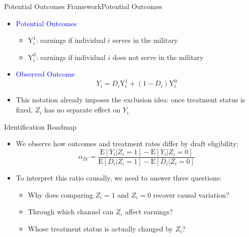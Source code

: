 \documentclass[dvipsnames,hyperref={pdfpagelabels=false}]{beamer}
\begin{document}
\begin{frame}{Potential Outcomes Framework}{Potential Outcomes}
	
	
	
	\begin{itemize}
		
		\item \textcolor{blue}{Potential Outcomes}
		\vspace{0.2cm}
		\begin{itemize}
			\item $\mathrm{Y}^{1}_{i}$: earnings if individual $i$ serves in the military
			\vspace{0.2cm}
			\item $\mathrm{Y}^{0}_{i}$: earnings if individual $i$ does not serve in the military
			\vspace{0.2cm}
		\end{itemize}
		\vspace{0.2cm}
		\item \textcolor{blue}{Observed Outcome}
		\begin{equation*}
			Y_{i}=D_{i}\mathrm{Y}^{1}_{i}+(1-D_{i})\mathrm{Y}^{0}_{i}
		\end{equation*}
		\vspace{0.2cm}
		\item This notation already imposes the exclusion idea: once treatment status is fixed, $Z_{i}$ has no separate effect on $Y_{i}$
		
	\end{itemize}
\end{frame}


\begin{frame}{Identification Roadmap}
	\begin{itemize}
		\item We observe how outcomes and treatment rates differ by draft eligibility:
		\begin{equation*}
			\alpha_{IV}=
			\dfrac{\mathrm{E}[Y_{i}|Z_{i}=1]-\mathrm{E}[Y_{i}|Z_{i}=0]}
			{\mathrm{E}[D_{i}|Z_{i}=1]-\mathrm{E}[D_{i}|Z_{i}=0]}
		\end{equation*}
		\vspace{0.2cm}
		\item To interpret this ratio causally, we need to answer three questions:
		\vspace{0.2cm}
		\begin{itemize}
			\item Why does comparing $Z_i=1$ and $Z_i=0$ recover causal variation?
			\vspace{0.2cm}
			\item Through which channel can $Z_i$ affect earnings?
			\vspace{0.2cm}
			\item Whose treatment status is actually changed by $Z_i$?
		\end{itemize}
	\end{itemize}
\end{frame}
\end{document}
